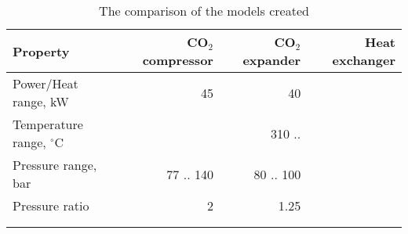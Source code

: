 \begin{table}
\label{tab:DiscussionComparison}
\caption{The comparison of the models created}
\begin{center}
\begin{tabulary}{0.9\textwidth}{LRRR}
\toprule
Property    	                &	CO$_2$ compressor   & CO$_2$	expander    & Heat exchanger    \\
\midrule
Power/Heat range, kW            &       45              &       40              &                   \\
Temperature range, $^\circ$C    &                       &      310 ..         &                   \\
Pressure range, bar             &   77 .. 140           &     80 .. 100         &                   \\
Pressure ratio                  &   2                   &        1.25           &                   \\
& & & \\
& & & \\
\bottomrule
\end{tabulary}
\end{center}
\end{table}